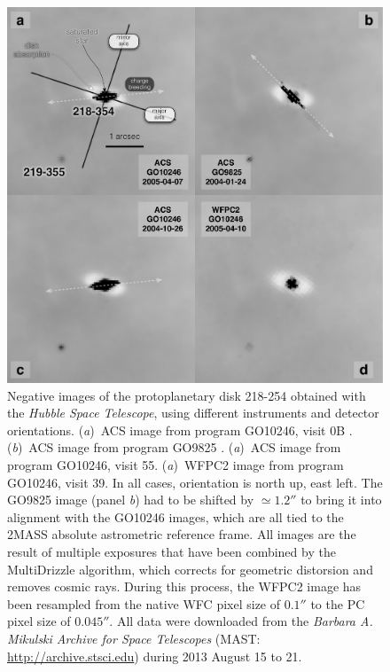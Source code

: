 \documentclass[oneside, 11pt]{article}
\begin{document}
\begin{figure}
  \centering
  \includegraphics[width=\linewidth]{four-images-218-354}
  \caption[]{Negative images of the protoplanetary disk 218-254 obtained with the \textit{Hubble Space Telescope}, using different instruments and detector orientations.  (\textit{a})~ACS image from program GO10246, visit 0B \citep{Robberto:2013a}.  (\textit{b})~ACS image from program GO9825 \citep{Bally:2006a}.  (\textit{a})~ACS image from program GO10246, visit 55.  (\textit{a})~WFPC2 image from program GO10246, visit 39.   In all cases, orientation is north up, east left.   The GO9825 image (panel \textit{b}) had to be shifted by \(\simeq 1.2''\) to bring it into alignment with the GO10246 images, which are all tied to the 2MASS absolute astrometric reference frame.  All images are the result of multiple exposures that have been combined by the MultiDrizzle algorithm, which corrects for geometric distorsion and removes cosmic rays.  During this process, the WFPC2 image has been resampled from the native WFC pixel size of \(0.1''\) to the PC pixel size of \(0.045''\).  All data were downloaded from the \textit{Barbara A. Mikulski Archive for Space Telescopes} (MAST: \url{http://archive.stsci.edu}) during 2013 August 15 to 21.  }
  \label{fig:hst-images}
\end{figure}
\end{document}
